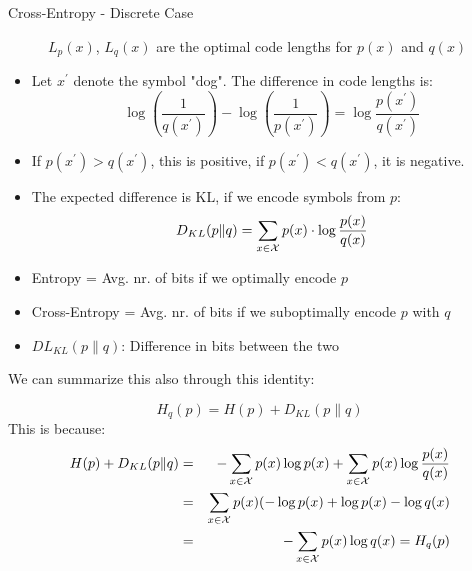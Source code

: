\begin{vbframe} {Cross-Entropy - Discrete Case}
  \framebreak

  \begin{figure}
    \centering
      \caption{\footnotesize{$L_p(x)$, $L_q(x)$ are the optimal code lengths for $p(x)$ and $q(x)$}}
  \end{figure}
  
  \begin{itemize}
   \item Let $x^\prime$ denote the symbol "dog". The difference in code lengths is:
  $$ \log \left ( \frac{1}{q(x^\prime)} \right ) - \log \left( \frac{1}{p(x^\prime)} \right) = \log \frac{p(x^\prime)}{q(x^\prime)} $$
  
\item If $p(x^\prime) > q(x^\prime)$, this is positive, if $p(x^\prime) < q(x^\prime)$, it is negative. 
    \item The expected difference is KL, if we encode symbols from $p$:
  $$ D_{KL}(p \| q) = \sum_{x \in \mathcal{X}} p(x) \cdot \log \frac{p(x)}{q(x)} $$
  \end{itemize}

\framebreak 

\begin{itemize}
\item Entropy = Avg. nr. of bits if we optimally encode $p$
\item Cross-Entropy = Avg. nr. of bits if we suboptimally encode $p$ with $q$
\item $DL_ {KL}(p \| q)$: Difference in bits between the two
\end{itemize}

\lz

We can summarize this also through this identity: 

$$
H_q(p) = H(p) + D_{KL}(p \| q)
$$
This is because: 
\begin{eqnarray*}
H(p) + D_{KL}(p \| q) &=& - \sum_{x \in \mathcal{X}} p(x) \log p(x) + \sum_{x \in \mathcal{X}} p(x) \log \frac{p(x)}{q(x)} \\
                      &=& \sum_{x \in \mathcal{X}} p(x) (-\log p(x) +  \log p(x) - \log q(x) \\
&=& - \sum_{x \in \mathcal{X}} p(x) \log q(x) = H_q(p) \\
\end{eqnarray*}
   
\framebreak
\end{vbframe}

